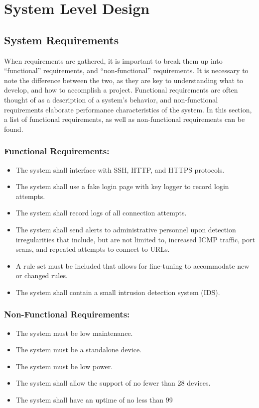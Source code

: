 \chapter{System Level Design}

\section{System Requirements}
When requirements are gathered, it is important to break them up into “functional” requirements, and “non-functional” requirements. It is necessary to note the difference between the two, as they are key to understanding what to develop, and how to accomplish a project. Functional requirements are often thought of as a description of a system’s behavior, and non-functional requirements elaborate performance characteristics of the system. In this section, a list of functional requirements, as well as non-functional requirements can be found.

\subsection{Functional Requirements:}
\begin{itemize}
\item The system shall interface with SSH, HTTP, and HTTPS protocols.
\item The system shall use a fake login page with key logger to record login attempts.
\item The system shall record logs of all connection attempts.
\item The system shall send alerts to administrative personnel upon detection irregularities that include, but are not limited to, increased ICMP traffic, port scans, and repeated attempts to connect to URLs.
\item A rule set must be included that allows for fine-tuning to accommodate new or changed rules.
\item The system shall contain a small intrusion detection system (IDS).
\end{itemize}

\subsection{Non-Functional Requirements:}
\begin{itemize}
\item The system must be low maintenance.
\item The system must be a standalone device.
\item The system must be low power.
\item The system shall allow the support of no fewer than 28 devices.
\item The system shall have an uptime of no less than 99%
\end{itemize}

